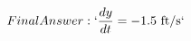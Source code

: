 \documentclass[preview]{standalone}
\begin{document}
\begin{align*}
Final Answer: `\frac{dy}{dt} = -1.5 \text{ ft/s}`
\end{align*}
\end{document}
